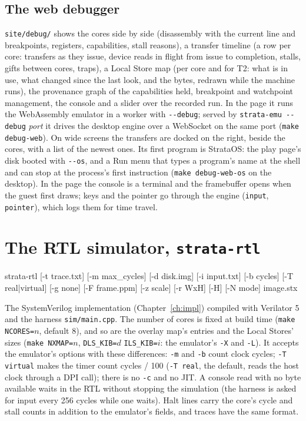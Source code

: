 \subsection{The web debugger}
\texttt{site/debug/} shows the cores side by side (disassembly with the current line and breakpoints,
registers, capabilities, stall reasons), a transfer timeline (a row per core: transfers as they issue,
device reads in flight from issue to completion, stalls, gifts between cores, traps), a Local Store map
(per core and for T2: what is in use, what changed since the last look, and the bytes, redrawn while the machine runs),
the provenance graph of the capabilities held, breakpoint and watchpoint management, the console and a
slider over the recorded run. In the page it runs the WebAssembly emulator in a worker with
\texttt{-{}-debug}; served by \texttt{strata-emu -{}-debug} \textit{port} it drives the desktop engine
over a WebSocket on the same port (\texttt{make debug-web}). On wide screens the transfers are docked
on the right, beside the cores, with a list of the newest ones. Its first program is StrataOS: the play
page's disk booted with \texttt{-{}-os}, and a Run menu that types a program's name at the shell and can
stop at the process's first instruction (\texttt{make debug-web-os} on the desktop). In the page the
console is a terminal and the framebuffer opens when the guest first draws; keys and the pointer go through
the engine (\texttt{input}, \texttt{pointer}), which logs them for time travel.

\section{The RTL simulator, \texttt{strata-rtl}}

\begin{shell}
strata-rtl [-t trace.txt] [-m max_cycles] [-d disk.img] [-i input.txt] [-b cycles]
           [-T real|virtual] [-g none] [-F frame.ppm] [-z scale] [-r WxH] [-H] [-N mode] image.stx
\end{shell}

The SystemVerilog implementation (Chapter~\ref{ch:impl}) compiled with Verilator 5 and the harness
\texttt{sim/main.cpp}. The number of cores is fixed at build time (\texttt{make NCORES=}$n$, default
8), and so are the overlay map's entries and the Local Stores' sizes (\texttt{make NXMAP=}$n$,
\texttt{DLS\_KIB=}$d$ \texttt{ILS\_KIB=}$i$: the emulator's \texttt{-X} and \texttt{-L}). It accepts the emulator's options with these differences: \texttt{-m} and \texttt{-b} count clock
cycles; \texttt{-T virtual} makes the timer count cycles / 100 (\texttt{-T real}, the default, reads
the host clock through a DPI call); there is no \texttt{-c} and no JIT. A console read with no byte
available waits in the RTL without stopping the simulation (the harness is asked for input every
256 cycles while one waits). Halt lines carry the core's cycle
and stall counts in addition to the emulator's fields, and traces have the same format.

